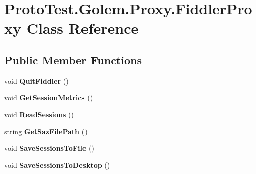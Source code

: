 \hypertarget{class_proto_test_1_1_golem_1_1_proxy_1_1_fiddler_proxy}{\section{Proto\-Test.\-Golem.\-Proxy.\-Fiddler\-Proxy Class Reference}
\label{class_proto_test_1_1_golem_1_1_proxy_1_1_fiddler_proxy}
}
\subsection*{Public Member Functions}
\begin{DoxyCompactItemize}
\item 
\hypertarget{class_proto_test_1_1_golem_1_1_proxy_1_1_fiddler_proxy_a1cfd7635106055482360fe45155b235f}{void {\bfseries Quit\-Fiddler} ()}\label{class_proto_test_1_1_golem_1_1_proxy_1_1_fiddler_proxy_a1cfd7635106055482360fe45155b235f}

\item 
\hypertarget{class_proto_test_1_1_golem_1_1_proxy_1_1_fiddler_proxy_a1381b2eee0172a9722c16b87dad0a2e9}{void {\bfseries Get\-Session\-Metrics} ()}\label{class_proto_test_1_1_golem_1_1_proxy_1_1_fiddler_proxy_a1381b2eee0172a9722c16b87dad0a2e9}

\item 
\hypertarget{class_proto_test_1_1_golem_1_1_proxy_1_1_fiddler_proxy_ad5bc4d9f6709f60561fad52cb50008c2}{void {\bfseries Read\-Sessions} ()}\label{class_proto_test_1_1_golem_1_1_proxy_1_1_fiddler_proxy_ad5bc4d9f6709f60561fad52cb50008c2}

\item 
\hypertarget{class_proto_test_1_1_golem_1_1_proxy_1_1_fiddler_proxy_a3c96adb346aacfc9453b68b6c537eb6f}{string {\bfseries Get\-Saz\-File\-Path} ()}\label{class_proto_test_1_1_golem_1_1_proxy_1_1_fiddler_proxy_a3c96adb346aacfc9453b68b6c537eb6f}

\item 
\hypertarget{class_proto_test_1_1_golem_1_1_proxy_1_1_fiddler_proxy_a26c69c9bfad89250e1ae8d852b91bda1}{void {\bfseries Save\-Sessions\-To\-File} ()}\label{class_proto_test_1_1_golem_1_1_proxy_1_1_fiddler_proxy_a26c69c9bfad89250e1ae8d852b91bda1}

\item 
\hypertarget{class_proto_test_1_1_golem_1_1_proxy_1_1_fiddler_proxy_a26bd38638e0f9707b8b1a490ba741f00}{void {\bfseries Save\-Sessions\-To\-Desktop} ()}\label{class_proto_test_1_1_golem_1_1_proxy_1_1_fiddler_proxy_a26bd38638e0f9707b8b1a490ba741f00}


\end{DoxyCompactItemize}

